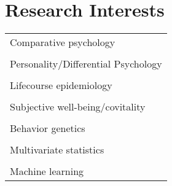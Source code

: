 \documentclass[11pt]{article}
\begin{document}
\section*{Research Interests}
\begin{tabular}{p{15cm}}
  Comparative psychology \\ \\

  Personality/Differential Psychology \\ \\

  Lifecourse epidemiology \\ \\
  
  Subjective well-being/covitality \\ \\

  Behavior genetics \\ \\
        
  Multivariate statistics \\ \\

  Machine learning 
\end{tabular}
\end{document}
